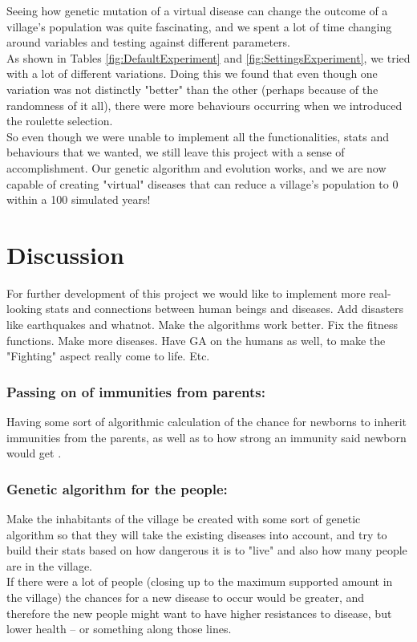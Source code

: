 \documentclass[conference,compsoc]{IEEEtran}
\begin{document}
Seeing how genetic mutation of a virtual disease can change the outcome of a village's population was quite fascinating, and we spent a lot of time changing around variables and testing against different parameters.\\
As shown in Tables \ref{fig:DefaultExperiment} and \ref{fig:SettingsExperiment}, we tried with a lot of different variations. Doing this we found that even though one variation was not distinctly "better" than the other (perhaps because of the randomness of it all), there were more behaviours occurring when we introduced the roulette selection.\\

So even though we were unable to implement all the functionalities, stats and behaviours that we wanted, we still leave this project with a sense of accomplishment. Our genetic algorithm and evolution works, and we are now capable of creating "virtual" diseases that can reduce a village's population to 0 within a 100 simulated years!\\

\section{Discussion}
For further development of this project we would like to implement more real-looking stats and connections between human beings and diseases. Add disasters like earthquakes and whatnot. Make the algorithms work better. Fix the fitness functions. Make more diseases. Have GA on the humans as well, to make the "Fighting" aspect really come to life. Etc.\\

\subsubsection*{Passing on of immunities from parents:}
Having some sort of algorithmic calculation of the chance for newborns to inherit immunities from the parents, as well as to how strong an immunity said newborn would get \cite{DSDimmunology}.\\

\subsubsection*{Genetic algorithm for the people:}
Make the inhabitants of the village be created with some sort of genetic algorithm so that they will take the existing diseases into account, and try to build their stats based on how dangerous it is to "live" and also how many people are in the village.\\ 
If there were a lot of people (closing up to the maximum supported amount in the village) the chances for a new disease to occur would be greater, and therefore the new people might want to have higher resistances to disease, but lower health – or something along those lines.\\
\end{document}
